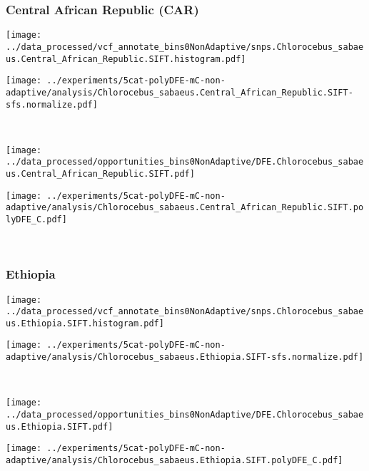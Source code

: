 \subsubsection{Central African Republic (CAR)}

\begin{minipage}{0.49\linewidth}
    \texttt{[image: ../data\_processed/vcf\_annotate\_bins0NonAdaptive/snps.Chlorocebus\_sabaeus.Central\_African\_Republic.SIFT.histogram.pdf]}
\end{minipage}
\begin{minipage}{0.49\linewidth}
    \texttt{[image: ../experiments/5cat-polyDFE-mC-non-adaptive/analysis/Chlorocebus\_sabaeus.Central\_African\_Republic.SIFT-sfs.normalize.pdf]}
\end{minipage}
\\
\begin{minipage}{0.49\linewidth}
    \texttt{[image: ../data\_processed/opportunities\_bins0NonAdaptive/DFE.Chlorocebus\_sabaeus.Central\_African\_Republic.SIFT.pdf]}
\end{minipage}
\begin{minipage}{0.49\linewidth}
    \texttt{[image: ../experiments/5cat-polyDFE-mC-non-adaptive/analysis/Chlorocebus\_sabaeus.Central\_African\_Republic.SIFT.polyDFE\_C.pdf]}
\end{minipage}
\\

\subsubsection{Ethiopia}

\begin{minipage}{0.49\linewidth}
    \texttt{[image: ../data\_processed/vcf\_annotate\_bins0NonAdaptive/snps.Chlorocebus\_sabaeus.Ethiopia.SIFT.histogram.pdf]}
\end{minipage}
\begin{minipage}{0.49\linewidth}
    \texttt{[image: ../experiments/5cat-polyDFE-mC-non-adaptive/analysis/Chlorocebus\_sabaeus.Ethiopia.SIFT-sfs.normalize.pdf]}
\end{minipage}
\\
\begin{minipage}{0.49\linewidth}
    \texttt{[image: ../data\_processed/opportunities\_bins0NonAdaptive/DFE.Chlorocebus\_sabaeus.Ethiopia.SIFT.pdf]}
\end{minipage}
\begin{minipage}{0.49\linewidth}
    \texttt{[image: ../experiments/5cat-polyDFE-mC-non-adaptive/analysis/Chlorocebus\_sabaeus.Ethiopia.SIFT.polyDFE\_C.pdf]}
\end{minipage}
\\

